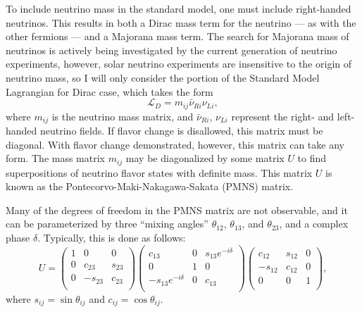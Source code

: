 To include neutrino mass in the standard model, one must include right-handed neutrinos.
This results in both a Dirac mass term for the neutrino --- as with the other fermions --- and a Majorana mass term.
The search for Majorana mass of neutrinos is actively being investigated by the current generation of neutrino experiments, however, solar neutrino experiments are insensitive to the origin of neutrino mass, so I will only consider the portion of the Standard Model Lagrangian for Dirac case, which takes the form
\begin{equation}
\mathscr{L}_D = m_{ij} \bar{\nu}_{Ri} \nu_{Li},
\end{equation}
where $m_{ij}$ is the neutrino mass matrix, and $\bar{\nu}_{Ri}$, $\nu_{Li}$ represent the right- and left-handed neutrino fields.
If flavor change is disallowed, this matrix must be diagonal.
With flavor change demonstrated, however, this matrix can take any form.
The mass matrix $m_{ij}$ may be diagonalized by some matrix $U$ to find superpositions of neutrino flavor states with definite mass.
This matrix $U$ is known as the Pontecorvo-Maki-Nakagawa-Sakata (PMNS) matrix.

Many of the degrees of freedom in the PMNS matrix are not observable, and it can be parameterized by three ``mixing angles'' $\theta_{12}$, $\theta_{13}$, and $\theta_{23}$, and a complex phase $\delta$.
Typically, this is done as follows:
\begin{equation}
U = 
\left(
\begin{array}{ccc}
1 & 0        & 0\\
0 & c_{23}   & s_{23}\\
0 & -s_{23}  & c_{23}\\
\end{array}
\right)
\left(
\begin{array}{ccc}
c_{13}              & 0  & s_{13}e^{-i\delta} \\
0                   & 1  & 0                  \\
-s_{13}e^{-i\delta} & 0  & c_{13}             \\
\end{array}
\right)
\left(
\begin{array}{ccc}
c_{12}  & s_{12} & 0 \\
-s_{12} & c_{12} & 0 \\
0       & 0      & 1 \\
\end{array}
\right),
\end{equation}
where $s_{ij} = \sin{\theta_{ij}}$ and $c_{ij} = \cos{\theta_{ij}}$.


